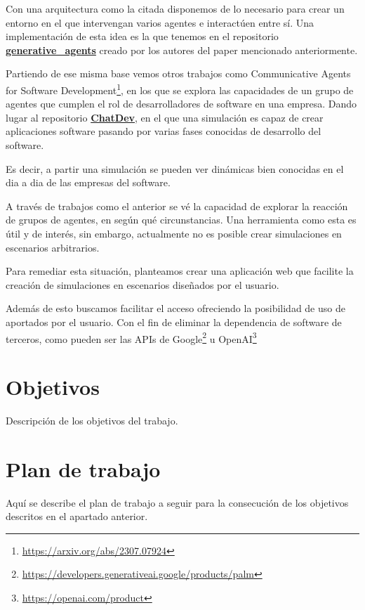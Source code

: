 Con una arquitectura como la citada disponemos de lo necesario para crear un entorno en el que intervengan varios agentes e interactúen entre sí. Una implementación de esta idea es la que tenemos en el repositorio \href{https://github.com/joonspk-research/generative_agents}{\textbf{generative\_agents}} creado por los autores del paper mencionado anteriormente.

Partiendo de ese misma base vemos otros trabajos como Communicative Agents for Software Development\footnote{\url{https://arxiv.org/abs/2307.07924}}, en los que se explora las capacidades de un grupo de agentes que cumplen el rol de desarrolladores de software en una empresa. Dando lugar al repositorio \href{https://github.com/OpenBMB/ChatDev}{\textbf{ChatDev}}, en el que una simulación es capaz de crear aplicaciones software pasando por varias fases conocidas de desarrollo del software.

Es decir, a partir una simulación se pueden ver dinámicas bien conocidas en el dia a dia de las empresas del software.

A través de trabajos como el anterior se vé la capacidad de explorar la reacción de grupos de agentes, en según qué circunstancias.
Una herramienta como esta es útil y de interés, sin embargo, actualmente no es posible crear simulaciones en escenarios arbitrarios.

Para remediar esta situación, planteamos crear una aplicación web que facilite la creación de simulaciones en escenarios diseñados por el usuario.

Además de esto buscamos facilitar el acceso ofreciendo la posibilidad de uso de \mgl aportados por el usuario. Con el fin de eliminar la dependencia de software de terceros, como pueden ser las APIs de Google\footnote{\url{https://developers.generativeai.google/products/palm}} u OpenAI\footnote{\url{https://openai.com/product}}


\section{Objetivos}
Descripción de los objetivos del trabajo.


\section{Plan de trabajo}
Aquí se describe el plan de trabajo a seguir para la consecución de los objetivos descritos en el apartado anterior.



